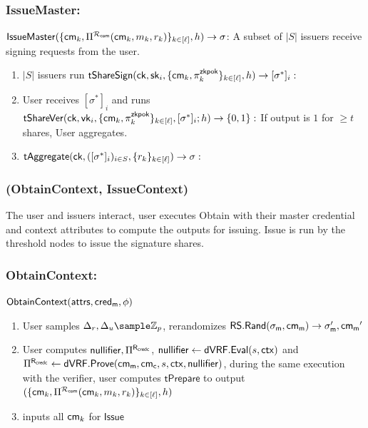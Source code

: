 \subsubsection{IssueMaster:}
$\mathsf{IssueMaster}(\{\mathsf{cm}_k, \Pi^{\mathcal{R}_{\mathsf{com}}}(\mathsf{cm}_k, m_k, r_k)\}_{k \in [\ell]}, h) \to \sigma$: A subset of $|S|$ issuers receive signing requests from the user. 
\begin{enumerate}
    \item $|S|$ issuers run $\mathsf{tShareSign}(\mathsf{ck}, \mathsf{sk}_i, \{\mathsf{cm}_k, \pi_k^{\mathsf{zkpok}}\}_{k \in [\ell]}, h) \to [\sigma^*]_i:$
    \item User receives $[\sigma^*]_i$ and runs $\mathsf{tShareVer}(\mathsf{ck}, \mathsf{vk}_i, \{\mathsf{cm}_k, \pi_k^{\mathsf{zkpok}}\}_{k \in [\ell]}, [\sigma^*]_i; h) \to \{0,1\}:$ If output is $1$ for $\geq t$ shares, User aggregates.
    \item $\mathsf{tAggregate}(\mathsf{ck}, ([\sigma^*]_i)_{i \in S}, \{r_k\}_{k \in [\ell]}) \to \sigma:$
\end{enumerate}

\subsubsection*{(ObtainContext, IssueContext)}
The user and issuers interact, user executes Obtain with their master credential and context attributes to compute the outputs for issuing. Issue is run by the threshold nodes to issue the signature shares.
\subsubsection*{ObtainContext:}
$\mathsf{ObtainContext}(\mathsf{attrs}, \mathsf{cred_m}, \phi)$
\begin{enumerate}
    \item User samples $\Delta_r, \Delta_u \sample \Z_p$, rerandomizes $\mathsf{RS.Rand}(\sigma_{\mathsf{m}}, \mathsf{cm_m}) \to \sigma_{\mathsf{m}}', \mathsf{cm_m}'$
    \item User computes $\mathsf{nullifier}, \Pi^{\mathsf{R}_{\mathsf{credc}}}$, $\mathsf{nullifier} \gets \mathsf{dVRF.Eval}(s, \mathsf{ctx})$ and $\Pi^{\mathsf{R}_{\mathsf{credc}}} \gets \mathsf{dVRF.Prove}(\mathsf{cm_m}, \mathsf{cm_c}, s, \mathsf{ctx}, \mathsf{nullifier})$, during the same execution with the verifier, user computes  $\mathsf{tPrepare}$ to output $(\{\mathsf{cm}_k, \Pi^{\mathcal{R}_{\mathsf{com}}}(\mathsf{cm}_k, m_k, r_k)\}_{k \in [\ell]}, h)$
    \item inputs all $\mathsf{cm}_k$ for $\mathsf{Issue}$
\end{enumerate}

